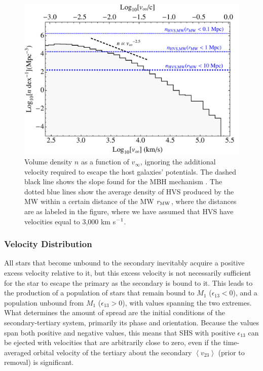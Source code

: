 \documentclass[a4paper,twocolumn]{emulateapj}
\begin{document}
{\begin{figure}
\centering\includegraphics[width=\linewidth,clip=true]{histogram}
\caption{Volume density $n$ as a function of $v_{\infty}$, ignoring the additional velocity required to escape the host galaxies' potentials. The dashed black line shows the slope found for the MBH mechanism \citep{Sesana:2007b,Sherwin:2008a}. The dotted blue lines show the average density of HVS produced by the MW within a certain distance of the MW $r_{\rm MW}$, where the distances are as labeled in the figure, where we have assumed that HVS have velocities equal to 3,000 km s$^{\smash{-1}}$.}
\label{fig:histogram}
\end{figure}

\subsubsection{Velocity Distribution}
All stars that become unbound to the secondary inevitably acquire a positive excess velocity relative to it, but this excess velocity is not necessarily sufficient for the star to escape the primary as the secondary is bound to it. This leads to the production of a population of stars that remain bound to $M_{1}$ ($\epsilon_{13} < 0$), and a population unbound from $M_{1}$ ($\epsilon_{13} > 0$), with values spanning the two extremes. What determines the amount of spread are the initial conditions of the secondary-tertiary system, primarily its phase and orientation. Because the values span both positive and negative values, this means that SHS with positive $\epsilon_{13}$ can be ejected with velocities that are arbitrarily close to zero, even if the time-averaged orbital velocity of the tertiary about the secondary $\left<v_{23}\right>$ (prior to removal) is significant.

}
\end{document}
